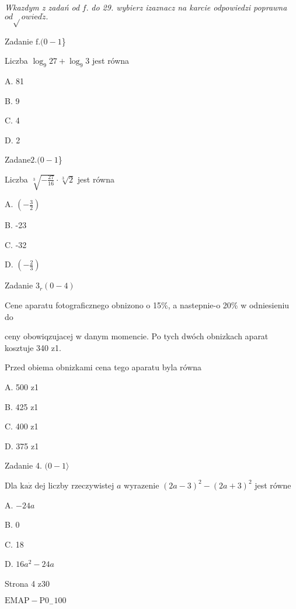 \documentclass[a4paper,12pt]{article}
\begin{document}
{\it Wkazdym z zadań od} $f.$ {\it do 29. wybierz izaznacz na karcie odpowiedzi poprawna} $od\sqrt{}owi\mathrm{e}d\acute{z}.$

Zadanie $\mathrm{f}. (0-1$\}

Liczba $\log_{9}27+\log_{9}3$ jest równa

A. 81

B. 9

C. 4

D. 2

Zadan$\mathrm{e}2. (0-1$\}

Liczba $\sqrt[3]{-\frac{27}{16}}\cdot\sqrt[3]{2}$ jest równa

A. $(-\displaystyle \frac{3}{2})$

B. -23

C. -32

D. $(-\displaystyle \frac{2}{3})$

Zadanie $3_{r}(0-4)$

Cene aparatu fotograficznego obnizono o 15\%, a nastepnie-o 20\% w odniesieniu do

ceny obowiqzujacej w danym momencie. Po tych dwóch obnizkach aparat kosztuje 340 z1.

Przed obiema obnizkami cena tego aparatu byla równa

A. 500 z1

B. 425 z1

C. 400 z1

D. 375 z1

Zadanie 4. $(0-1\rangle$

Dla $\mathrm{k}\mathrm{a}\dot{\mathrm{z}}$ dej liczby rzeczywistej $a$ wyrazenie $(2a-3)^{2}-(2a+3)^{2}$ jest równe

A. $-24a$

B. 0

C. 18

D. $16a^{2}-24a$

Strona 4 z30

$\mathrm{E}\mathrm{M}\mathrm{A}\mathrm{P}-\mathrm{P}0_{-}100$
\end{document}

